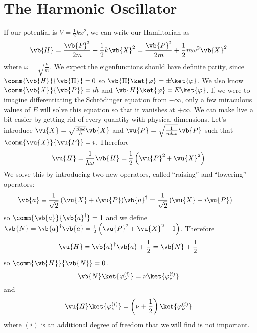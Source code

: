\documentclass[a4paper,twoside,master.tex]{subfiles}
\begin{document}
\chapter{The Harmonic Oscillator}

If our potential is $ V = \frac{1}{2} k x^2 $, we can write our Hamiltonian as
\begin{equation}
    \vb{H} = \frac{\vb{P}^2}{2m} + \frac{1}{2} k \vb{X}^2 = \frac{\vb{P}^2}{2m} + \frac{1}{2} m \omega^2 \vb{X}^2
\end{equation}
where $ \omega = \sqrt{\frac{k}{m}} $. We expect the eigenfunctions should have definite parity, since $ \comm{\vb{H}}{\vb{\Pi}} = 0 $ so $ \vb{\Pi} \ket{\varphi} = \pm \ket{\varphi} $. We also know $ \comm{\vb{X}}{\vb{P}} = \imath \hbar $ and $ \vb{H} \ket{\varphi} = E \ket{\varphi} $. If we were to imagine differentiating the Schr\"odinger equation from $ - \infty $, only a few miraculous values of $ E $ will solve this equation so that it vanishes at $ + \infty $. We can make live a bit easier by getting rid of every quantity with physical dimensions. Let's introduce $ \vu{X} = \sqrt{\frac{m \omega}{\hbar}}\vb{X} $ and $ \vu{P} = \sqrt{\frac{1}{m \hbar \omega}} \vb{P} $ such that $ \comm{\vu{X}}{\vu{P}} = \imath $. Therefore
\begin{equation}
    \vu{H} = \frac{1}{\hbar \omega} \vb{H} = \frac{1}{2} \left( \vu{P}^2 + \vu{X}^2 \right)
\end{equation}
We solve this by introducing two new operators, called ``raising'' and ``lowering'' operators:
\begin{align}
    \vb{a} \equiv \frac{1}{\sqrt{2}} \left( \vu{X} + \imath\vu{P} \right) & \vb{a}^\dagger = \frac{1}{\sqrt{2}} \left( \vu{X} - \imath\vu{P} \right)
\end{align}
so $ \comm{\vb{a}}{\vb{a}^\dagger} = 1 $ and we define $ \vb{N} = \vb{a}^\dagger\vb{a} = \frac{1}{2} \left( \vu{P}^2 + \vu{X}^2 - 1 \right) $. Therefore
\begin{equation}
    \vu{H} = \vb{a}^\dagger\vb{a} + \frac{1}{2} = \vb{N} + \frac{1}{2}
\end{equation}
so $ \comm{\vb{H}}{\vb{N}} = 0 $.
\begin{equation}
    \vb{N} \ket{\varphi_{\nu}^{(i)}} = \nu \ket{\varphi_{\nu}^{(i)}}
\end{equation}
and
\begin{equation}
    \vu{H} \ket{\varphi_{\nu}^{(i)}} = \left( \nu + \frac{1}{2} \right) \ket{\varphi_{\nu}^{(i)}}
\end{equation}
where $ (i) $ is an additional degree of freedom that we will find is not important.
\end{document}
